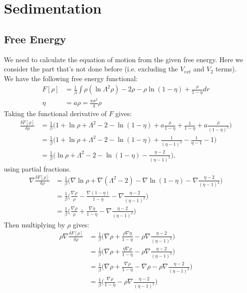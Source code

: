 \documentclass[11pt, a4paper]{article}
\theoremstyle{definition}
\begin{document}
\section{Sedimentation}	
	
	\subsection{Free Energy}
	We need to calculate the equation of motion from the given free energy. Here we consider the part that's not done before (i.e. excluding the $V_{ext}$ and $V_2$ terms).
	We have the following free energy functional:
	\begin{align*}
	F[\rho] &= \frac{1}{\beta} \int \rho (\ln \Lambda^2 \rho) - 2 \rho - \rho \ln(1 - \eta) + \frac{\rho}{1 - \eta} dr\\
	\eta &= a \rho = \frac{\pi \sigma^2}{4} \rho
	\end{align*}
	Taking the functional derivative of $F$ gives:
	\begin{align*}
	\frac{\delta F[\rho]}{\delta \rho} &= \frac{1}{\beta} \bigg(1 + \ln \rho + \Lambda^2 -2 - \ln(1-\eta) + a \frac{\rho}{1 - \eta} + \frac{1}{1 - \eta} + a \frac{\rho}{(1 - \eta)^2}  \bigg)\\
	&= \frac{1}{\beta} \bigg(1 + \ln \rho + \Lambda^2 -2 - \ln(1-\eta) + \frac{1}{(\eta - 1)^2} - \frac{1}{\eta - 1}  - 1\bigg)\\
	&= \frac{1}{\beta} \bigg( \ln \rho + \Lambda^2 - 2 - \ln(1-\eta) - \frac{\eta - 2}{(\eta - 1)^2}  \bigg),
	\end{align*}
	using partial fractions.
	\begin{align*}
	\nabla \frac{\delta F[\rho]}{\delta \rho} &= \frac{1}{\beta} \bigg( \nabla\ln \rho + \nabla(\Lambda^2 - 2) - \nabla\ln(1-\eta) - \nabla\frac{\eta - 2}{(\eta - 1)^2}  \bigg)\\
	& = \frac{1}{\beta} \bigg( \frac{\nabla \rho}{\rho} - \frac{\nabla( 1- \eta)}{1 - \eta} - \nabla\frac{\eta - 2}{(\eta - 1)^2}  \bigg)\\
	& = \frac{1}{\beta} \bigg( \frac{\nabla \rho}{\rho} + \frac{\nabla \eta}{1 - \eta} - \nabla\frac{\eta - 2}{(\eta - 1)^2}  \bigg)
	\end{align*}
	Then multiplying by $\rho$ gives:
	\begin{align*}
	\rho \nabla \frac{\delta F[\rho]}{\delta \rho} &= \frac{1}{\beta} \bigg( \nabla \rho +   \frac{\rho \nabla \eta}{1 - \eta} - \rho \nabla\frac{\eta - 2}{(\eta - 1)^2}  \bigg)\\
	&= \frac{1}{\beta} \bigg( \nabla \rho +   \frac{\eta\nabla \rho}{1 - \eta} - \rho \nabla\frac{\eta - 2}{(\eta - 1)^2}  \bigg)\\
	&= \frac{1}{\beta} \bigg( \nabla \rho + \frac{\nabla \rho}{1 - \eta} - \nabla \rho - \rho \nabla\frac{\eta - 2}{(\eta - 1)^2}  \bigg)\\
	&= \frac{1}{\beta} \bigg(  \frac{\nabla \rho}{1 - \eta}  - \rho \nabla\frac{\eta - 2}{(\eta - 1)^2}  \bigg)
	\end{align*}
\end{document}
